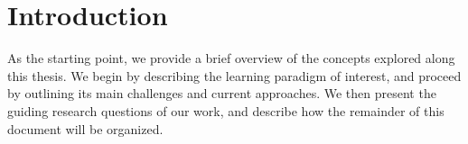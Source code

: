 
\chapter[Introduction]{Introduction}
\label{sec:introduction}

As the starting point, we provide a brief overview of the concepts explored along this thesis. We begin by describing the learning paradigm of interest,
and proceed by outlining its main challenges and current approaches.
We then present the guiding research questions of our work, and describe how the remainder of this document will be organized.



